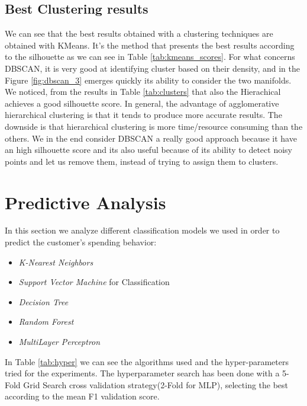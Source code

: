 \documentclass[12pt]{article}
\begin{document}
\subsection{Best Clustering results}
We can see that the best results obtained with a clustering techniques are obtained with KMeans. It's the method that presents the best results according to the silhouette as we can see in Table \ref{tab:kmeans_scores}. For what concerns DBSCAN, it is very good at identifying cluster based on their density, and in the Figure \ref{fig:dbscan_3} emerges quickly its ability to consider the two manifolds. We noticed, from the results in Table \ref{tab:clusters} that also the Hierachical achieves a good silhouette score. In general, the advantage of agglomerative hierarchical clustering is that it tends to produce more accurate results. The downside is that hierarchical clustering is more time/resource consuming than the others. We in the end consider DBSCAN a really good approach because it have an high silhouette score and its also useful because of its ability to detect noisy points and let us remove them, instead of trying to assign them to clusters.

\section{Predictive Analysis}
In this section we analyze different classification models we used in order to predict the customer's spending behavior:
\begin{itemize}
    \item \textit{K-Nearest Neighbors}
    \item \textit{Support Vector Machine} for Classification
    \item \textit{Decision Tree}
    \item \textit{Random Forest}
    \item \textit{MultiLayer Perceptron}
\end{itemize}
In Table \ref{tab:hyper} we can see the algorithms used and the hyper-parameters tried for the experiments.
The hyperparameter search has been done with a 5-Fold Grid Search cross validation strategy(2-Fold for MLP), selecting the best according to the mean F1 validation score.
\end{document}
